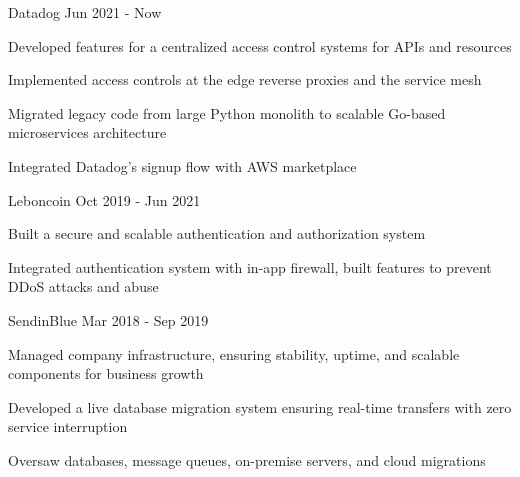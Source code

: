 


\begin{cventries}

\cventry
{} %
{Datadog} %
{Jun 2021 - Now} %
{} %
{ %
\begin{cvitems}
\item {Developed features for a centralized access control systems for APIs and resources}
\item {Implemented access controls at the edge reverse proxies and the service mesh}
\item {Migrated legacy code from large Python monolith to scalable Go-based microservices architecture}
\item {Integrated Datadog's signup flow with AWS marketplace}
\end{cvitems}
}


\cventry
{} %
{Leboncoin} %
{Oct 2019 - Jun 2021} %
{} %
{ %
\begin{cvitems}
\item {Built a secure and scalable authentication and authorization system}
\item {Integrated authentication system with in-app firewall, built features to prevent DDoS attacks and abuse}
\end{cvitems}
}


\cventry
{} %
{SendinBlue} %
{Mar 2018 - Sep 2019} %
{} %
{ %
\begin{cvitems}
\item {Managed company infrastructure, ensuring stability, uptime, and scalable components for business growth}
\item {Developed a live database migration system ensuring real-time transfers with zero service interruption}
\item {Oversaw databases, message queues, on-premise servers, and cloud migrations}
\end{cvitems}
}


\end{cventries}
